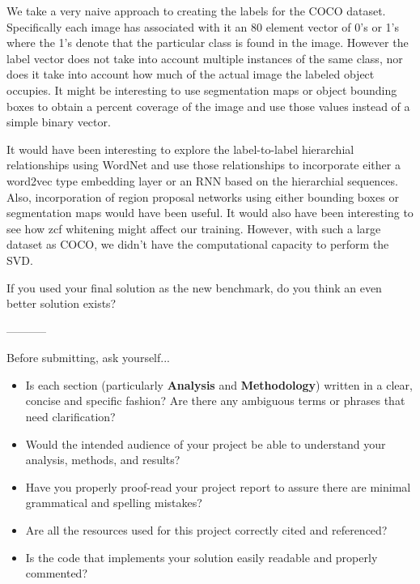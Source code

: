 \documentclass[12pt,journal,compsoc]{IEEEtran}
\begin{document}

We take a very naive approach to creating the labels for the COCO dataset.  Specifically each image has associated with it an 80 element vector of 0's or 1's where the 1's denote that the particular class is found in the image.  However the label vector does not take into account multiple instances of the same class, nor does it take into account how much of the actual image the labeled object occupies.  It might be interesting to use segmentation maps or object bounding boxes to obtain a percent coverage of the image and use those values instead of a simple binary vector.


It would have been interesting to explore the label-to-label hierarchial relationships using WordNet and use those relationships to incorporate either a word2vec type embedding layer or an RNN based on the hierarchial sequences.  Also, incorporation of region proposal networks using either bounding boxes or segmentation maps would have been useful.  It would also have been interesting to see how zcf whitening might affect our training.  However, with such a large dataset as COCO, we didn't have the computational capacity to perform the SVD.

If you used your final solution as the new benchmark, do you think an even better solution exists?

-----------

Before submitting, ask yourself...
\begin{itemize}

  \item Is each section (particularly \textbf{Analysis} and \textbf{Methodology}) written in a clear, concise and specific fashion? Are there any ambiguous terms or phrases that need clarification?
  \item Would the intended audience of your project be able to understand your analysis, methods, and results?
  \item Have you properly proof-read your project report to assure there are minimal grammatical and spelling mistakes?
  \item Are all the resources used for this project correctly cited and referenced?
  \item Is the code that implements your solution easily readable and properly commented?

\end{itemize}
\end{document}
